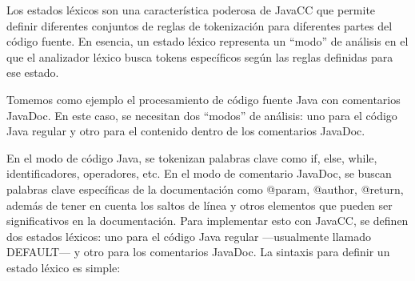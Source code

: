 





\noindent Los estados léxicos son una característica poderosa de JavaCC que permite definir diferentes conjuntos de reglas de tokenización para diferentes partes del código fuente. En esencia, un estado léxico representa un ``modo'' de análisis en el que el analizador léxico busca tokens específicos según las reglas definidas para ese estado.

Tomemos como ejemplo el procesamiento de código fuente Java con comentarios JavaDoc. En este caso, se necesitan dos ``modos'' de análisis: uno para el código Java regular y otro para el contenido dentro de los comentarios JavaDoc.

En el modo de código Java, se tokenizan palabras clave como if, else, while, identificadores, operadores, etc.
En el modo de comentario JavaDoc, se buscan palabras clave específicas de la documentación como @param, @author, @return, además de tener en cuenta los saltos de línea y otros elementos que pueden ser significativos en la documentación.
Para implementar esto con JavaCC, se definen dos estados léxicos: uno para el código Java regular ---usualmente llamado DEFAULT--- y otro para los comentarios JavaDoc. La sintaxis para definir un estado léxico es simple:

